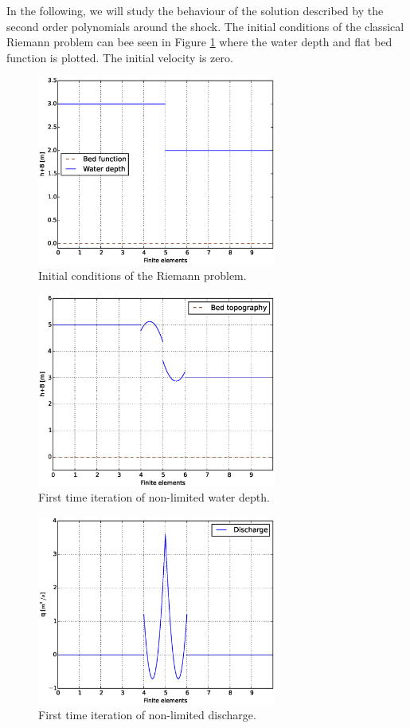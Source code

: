 In the following, we will study the behaviour of the solution described by the second order polynomials around the shock. The initial conditions of the classical Riemann problem can bee seen in Figure \ref{riemann} where the water depth and flat bed function is plotted. The initial velocity is zero.
\begin{figure}
\centering
\includegraphics[width=0.7\textwidth]{OBR/riemann.eps}
\caption{Initial conditions of the Riemann problem.}\label{riemann}
\end{figure}
\begin{figure}
\centering
\includegraphics[width=0.7\textwidth]{OBR/first.eps}
\caption{First time iteration of non-limited water depth.}\label{first}
\end{figure}
\begin{figure}
\centering
\includegraphics[width=0.7\textwidth]{OBR/HU.eps}
\caption{First time iteration of non-limited discharge.}\label{HU}
\end{figure}
